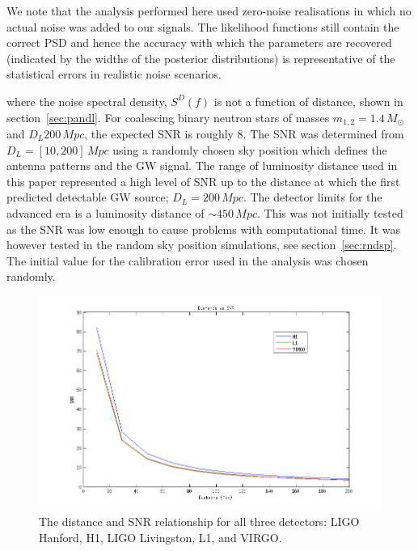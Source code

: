 \documentclass[12pt]{iopart}
\begin{document}
We note that the analysis performed here used zero-noise realisations in which
no actual noise was added to our signals.  The likelihood functions still
contain the correct \ac{PSD} and hence the accuracy with which the parameters
are recovered (indicated by the widths of the posterior distributions) is
representative of the statistical errors in realistic noise scenarios.





where the noise spectral density, $S^D(f)$ is not a function of distance, shown
in section~\ref{sec:pandl}. For coalescing binary neutron stars of masses
$m_{1,2} = 1.4\,M_{\odot}$ and  $D_{L}200\,Mpc$, the expected SNR is roughly 8.
The SNR was determined from $D_{L} = [10,200]\,Mpc$  using a randomly chosen
sky position which defines the antenna patterns and the GW signal. The range of
luminosity distance used in this paper represented a high level of SNR up to
the distance at which the first predicted detectable GW source; $D_{L} =
200\,Mpc$. The detector limits for the advanced era is a luminosity distance of
$\sim 450\,Mpc$. This was not initially tested as the SNR was low enough to
cause problems with computational time. It was however tested in the random sky
position simulations, see section~\ref{sec:rndsp}. The initial value for the
calibration error used in the analysis was chosen randomly.

\begin{figure}
  \centering
  \includegraphics[width = \textwidth]{DvsSNR-mult-det}
  \caption{The distance and SNR relationship for all three detectors:
LIGO Hanford, H1, LIGO Livingston, L1, and VIRGO.}
  \label{fig:distsnr}
\end{figure}
\end{document}
